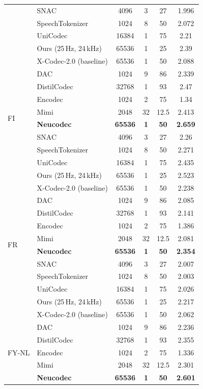 \documentclass[preprint]{article}
\begin{document}
\begin{longtable}{llcccc}
  & SNAC & 4096 & 3 & 27 & 1.996 \\
  & SpeechTokenizer & 1024 & 8 & 50 & 2.072 \\
  & UniCodec & 16384 & 1 & 75 & 2.21 \\
  & Ours (25\,Hz, 24\,kHz) & 65536 & 1 & 25 & 2.39 \\
  & X-Codec-2.0 (baseline) & 65536 & 1 & 50 & 2.088 \\
\midrule
\multirow{8}{*}{FI}
  & DAC & 1024 & 9 & 86 & 2.339 \\
  & DistilCodec & 32768 & 1 & 93 & 2.47 \\
  & Encodec & 1024 & 2 & 75 & 1.34 \\
  & Mimi & 2048 & 32 & 12.5 & 2.413 \\
  & \textbf{Neucodec} & \textbf{65536} & \textbf{1} & \textbf{50} & \textbf{2.659} \\
  & SNAC & 4096 & 3 & 27 & 2.26 \\
  & SpeechTokenizer & 1024 & 8 & 50 & 2.271 \\
  & UniCodec & 16384 & 1 & 75 & 2.435 \\
  & Ours (25\,Hz, 24\,kHz) & 65536 & 1 & 25 & 2.523 \\
  & X-Codec-2.0 (baseline) & 65536 & 1 & 50 & 2.238 \\
\midrule
\multirow{8}{*}{FR}
  & DAC & 1024 & 9 & 86 & 2.085 \\
  & DistilCodec & 32768 & 1 & 93 & 2.141 \\
  & Encodec & 1024 & 2 & 75 & 1.386 \\
  & Mimi & 2048 & 32 & 12.5 & 2.081 \\
  & \textbf{Neucodec} & \textbf{65536} & \textbf{1} & \textbf{50} & \textbf{2.354} \\
  & SNAC & 4096 & 3 & 27 & 2.007 \\
  & SpeechTokenizer & 1024 & 8 & 50 & 2.003 \\
  & UniCodec & 16384 & 1 & 75 & 2.026 \\
  & Ours (25\,Hz, 24\,kHz) & 65536 & 1 & 25 & 2.217 \\
  & X-Codec-2.0 (baseline) & 65536 & 1 & 50 & 2.062 \\
\midrule
\multirow{8}{*}{FY-NL}
  & DAC & 1024 & 9 & 86 & 2.236 \\
  & DistilCodec & 32768 & 1 & 93 & 2.355 \\
  & Encodec & 1024 & 2 & 75 & 1.336 \\
  & Mimi & 2048 & 32 & 12.5 & 2.301 \\
  & \textbf{Neucodec} & \textbf{65536} & \textbf{1} & \textbf{50} & \textbf{2.601} \\

\end{longtable}
\end{document}

